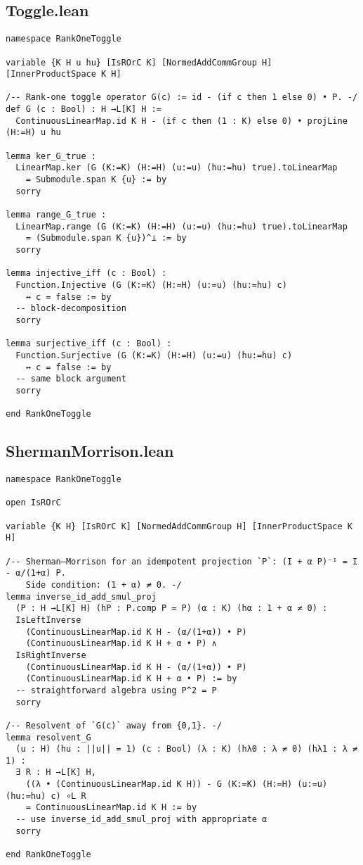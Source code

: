 \documentclass[11pt]{article}
\begin{document}
\subsection*{Toggle.lean}
\begin{lstlisting}
namespace RankOneToggle

variable {K H u hu} [IsROrC K] [NormedAddCommGroup H] [InnerProductSpace K H]

/-- Rank-one toggle operator G(c) := id - (if c then 1 else 0) • P. -/
def G (c : Bool) : H →L[K] H :=
  ContinuousLinearMap.id K H - (if c then (1 : K) else 0) • projLine (H:=H) u hu

lemma ker_G_true :
  LinearMap.ker (G (K:=K) (H:=H) (u:=u) (hu:=hu) true).toLinearMap
    = Submodule.span K {u} := by
  sorry

lemma range_G_true :
  LinearMap.range (G (K:=K) (H:=H) (u:=u) (hu:=hu) true).toLinearMap
    = (Submodule.span K {u})^⊥ := by
  sorry

lemma injective_iff (c : Bool) :
  Function.Injective (G (K:=K) (H:=H) (u:=u) (hu:=hu) c)
    ↔ c = false := by
  -- block-decomposition
  sorry

lemma surjective_iff (c : Bool) :
  Function.Surjective (G (K:=K) (H:=H) (u:=u) (hu:=hu) c)
    ↔ c = false := by
  -- same block argument
  sorry

end RankOneToggle
\end{lstlisting}

\subsection*{ShermanMorrison.lean}
\begin{lstlisting}
namespace RankOneToggle

open IsROrC

variable {K H} [IsROrC K] [NormedAddCommGroup H] [InnerProductSpace K H]

/-- Sherman–Morrison for an idempotent projection `P`: (I + α P)⁻¹ = I - α/(1+α) P.
    Side condition: (1 + α) ≠ 0. -/
lemma inverse_id_add_smul_proj
  (P : H →L[K] H) (hP : P.comp P = P) (α : K) (hα : 1 + α ≠ 0) :
  IsLeftInverse
    (ContinuousLinearMap.id K H - (α/(1+α)) • P)
    (ContinuousLinearMap.id K H + α • P) ∧
  IsRightInverse
    (ContinuousLinearMap.id K H - (α/(1+α)) • P)
    (ContinuousLinearMap.id K H + α • P) := by
  -- straightforward algebra using P^2 = P
  sorry

/-- Resolvent of `G(c)` away from {0,1}. -/
lemma resolvent_G
  (u : H) (hu : ||u|| = 1) (c : Bool) (λ : K) (hλ0 : λ ≠ 0) (hλ1 : λ ≠ 1) :
  ∃ R : H →L[K] H,
    ((λ • (ContinuousLinearMap.id K H)) - G (K:=K) (H:=H) (u:=u) (hu:=hu) c) ∘L R
    = ContinuousLinearMap.id K H := by
  -- use inverse_id_add_smul_proj with appropriate α
  sorry

end RankOneToggle
\end{lstlisting}
\end{document}
